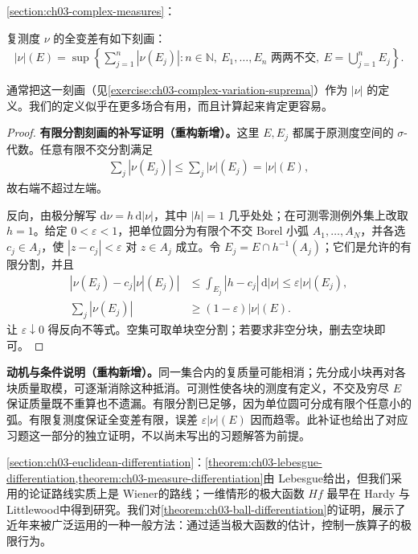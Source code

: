 \documentclass[../../main.tex]{subfiles}%
\begin{document}
\cref{section:ch03-complex-measures}：
\begin{proposition}\label{proposition:ch03-notes-variation-partitions}
复测度 $\nu$ 的全变差有如下刻画：
\begin{align*}
|\nu|(E)=\sup\left\{\sum_{j=1}^n|\nu(E_j)|:
n\in\mathbb N,\ E_1,\ldots,E_n\text{ 两两不交},\ E=\bigcup_{j=1}^nE_j\right\}.
\end{align*}
\end{proposition}
通常把这一刻画（见\cref{exercise:ch03-complex-variation-suprema}）作为 $|\nu|$ 的定义。我们的定义似乎在更多场合有用，而且计算起来肯定更容易。
\begin{proof}
\textbf{有限分割刻画的补写证明（重构新增）。}这里 $E,E_j$ 都属于原测度空间的 $\sigma$-代数。任意有限不交分割满足
\begin{align*}
\sum_j|\nu(E_j)|\le\sum_j|\nu|(E_j)=|\nu|(E),
\end{align*}
故右端不超过左端。

反向，由极分解写 $\mathrm d\nu=h\,\mathrm d|\nu|$，其中 $|h|=1$ 几乎处处；在可测零测例外集上改取 $h=1$。给定 $0<\varepsilon<1$，把单位圆分为有限个不交 Borel 小弧 $A_1,\ldots,A_N$，并各选 $c_j\in A_j$，使 $|z-c_j|<\varepsilon$ 对 $z\in A_j$ 成立。令 $E_j=E\cap h^{-1}(A_j)$；它们是允许的有限分割，并且
\begin{align*}
|\nu(E_j)-c_j|\nu|(E_j)|
&\le\int_{E_j}|h-c_j|\,\mathrm d|\nu|
\le\varepsilon|\nu|(E_j),\\
\sum_j|\nu(E_j)|&\ge(1-\varepsilon)|\nu|(E).
\end{align*}
让 $\varepsilon\downarrow0$ 得反向不等式。空集可取单块空分割；若要求非空分块，删去空块即可。
\end{proof}
\begin{remark}
\textbf{动机与条件说明（重构新增）。}同一集合内的复质量可能相消；先分成小块再对各块质量取模，可逐渐消除这种抵消。可测性使各块的测度有定义，不交及穷尽 $E$ 保证质量既不重算也不遗漏。有限分割已足够，因为单位圆可分成有限个任意小的弧。有限复测度保证全变差有限，误差 $\varepsilon|\nu|(E)$ 因而趋零。此补证也给出了对应习题这一部分的独立证明，不以尚未写出的习题解答为前提。
\end{remark}

\cref{section:ch03-euclidean-differentiation}：\cref{theorem:ch03-lebesgue-differentiation,theorem:ch03-measure-differentiation}由 Lebesgue\cite{folland-bib-092}给出，但我们采用的论证路线实质上是 Wiener\cite{folland-bib-161}的路线；一维情形的极大函数 $Hf$ 最早在 Hardy 与 Littlewood\cite{folland-bib-064}中得到研究。我们对\cref{theorem:ch03-ball-differentiation}的证明，展示了近年来被广泛运用的一种一般方法：通过适当极大函数的估计，控制一族算子的极限行为。
\end{document}
